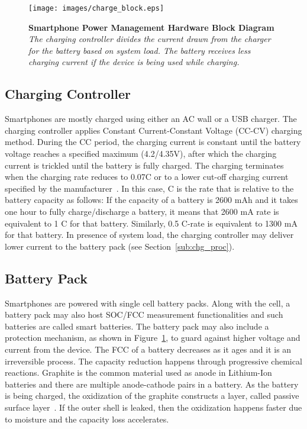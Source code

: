 \documentclass[journal]{IEEEtran}
\begin{document}
\begin{figure}[t]
 \begin{center}
 \texttt{[image: images/charge\_block.eps]}
\caption{{\bf Smartphone Power Management Hardware Block Diagram } {\sl The charging controller divides the current drawn from the charger for the battery based on system load. The battery receives less charging current if the device is being used while charging.}}
    \label{fig:charging_block}
 \end{center}
\end{figure}



\subsection{Charging Controller}
Smartphones are mostly charged using either an AC wall or a USB charger. The charging controller applies Constant Current-Constant Voltage (CC-CV) charging method. During the CC period, the charging current is constant until the battery voltage reaches a specified maximum (4.2/4.35V), after which the charging current is trickled until the battery is fully charged. The charging terminates when the charging rate reduces to 0.07C or to a lower cut-off charging current specified by the manufacturer~\cite{Thanh:2012}. In this case, C is the rate that is relative to the battery capacity as follows: If the capacity of a battery is 2600 mAh and it takes one hour to fully charge/discharge a battery, it means that 2600 mA rate is equivalent to 1 C for that battery. Similarly, 0.5 C-rate is equivalent to 1300 mA for that battery. In presence of system load, the charging controller may deliver lower current to the battery pack (see Section~\ref{sub:chg_proc}). 



\subsection{Battery Pack}
Smartphones are powered with single cell battery packs. Along with the cell, a battery pack may also host SOC/FCC measurement functionalities and such batteries are called smart batteries. The battery pack may also include a protection mechanism, as shown in Figure~\ref{fig:charging_block}, to guard against higher voltage and current from the device. The FCC of a battery decreases as it ages and it is an irreversible process. The capacity reduction happens through progressive chemical reactions. Graphite is the common material used as anode in Lithium-Ion batteries and there are multiple anode-cathode pairs in a battery. As the battery is being charged, the oxidization of the graphite constructs a layer, called passive surface layer~\cite{Kida20024157}. If the outer shell is leaked, then the oxidization happens faster due to moisture and the capacity loss accelerates. 
\end{document}
